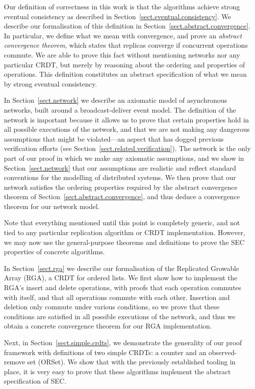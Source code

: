 Our definition of correctness in this work is that the algorithms achieve strong eventual consistency as described in Section~\ref{sect.eventual.consistency}.
We describe our formalisation of this definition in Section~\ref{sect.abstract.convergence}.
In particular, we define what we mean with convergence, and prove an \emph{abstract convergence theorem}, which states that replicas converge if concurrent operations commute.
We are able to prove this fact without mentioning networks nor any particular CRDT, but merely by reasoning about the ordering and properties of operations.
This definition constitutes an abstract specification of what we mean by strong eventual consistency.

In Section~\ref{sect.network} we describe an axiomatic model of asynchronous networks, built around a broadcast-deliver event model.
The definition of the network is important because it allows us to prove that certain properties hold in all possible executions of the network, and that we are not making any dangerous assumptions that might be violated---an aspect that has dogged previous verification efforts (see Section~\ref{sect.related.verification}).
The network is the only part of our proof in which we make any axiomatic assumptions, and we show in Section~\ref{sect.network} that our assumptions are realistic and reflect standard conventions for the modelling of distributed systems.
We then prove that our network satisfies the ordering properties required by the abstract convergence theorem of Section~\ref{sect.abstract.convergence}, and thus deduce a convergence theorem for our network model.

Note that everything mentioned until this point is completely generic, and not tied to any particular replication algorithm or CRDT implementation.
However, we may now use the general-purpose theorems and definitions to prove the SEC properties of concrete algorithms.

In Section~\ref{sect.rga} we describe our formalisation of the Replicated Growable Array (RGA), a CRDT for ordered lists.
We first show how to implement the RGA's insert and delete operations, with proofs that each operation commutes with itself, and that all operations commute with each other.
Insertion and deletion only commute under various conditions, so we prove that these conditions are satisfied in all possible executions of the network, and thus we obtain a concrete convergence theorem for our RGA implementation.

Next, in Section~\ref{sect.simple.crdts}, we demonstrate the generality of our proof framework with definitions of two simple CRDTs: a counter and an observed-remove set (ORSet).
We show that with the previously established tooling in place, it is very easy to prove that these algorithms implement the abstract specification of SEC.

